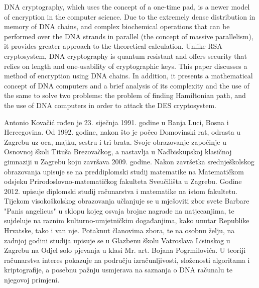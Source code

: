 \documentclass[a4paper,oneside,12pt]{memoir} %
\begin{document}
\begin{spacing}{1.5}
\begin{summary}
DNA cryptography, which uses the concept of a one-time pad, is a newer model of encryption in the computer science. Due to the extremely dense distribution in memory of DNA chains, and complex biochemical operations that can be performed over the DNA strands in parallel (the concept of massive parallelism), it provides greater approach to the theoretical calculation. Unlike RSA cryptosystem, DNA cryptography is quantum resistant and offers security that relies on length and one-usability of cryptographic keys. This paper discusses a method of encryption using DNA chains. In addition, it presents a mathematical concept of DNA computers and a brief analysis of its complexity and the use of the same to solve two problems: the problem of finding Hamiltonian path, and the use of DNA computers in order to attack the DES cryptosystem.
\end{summary}
\begin{cv}
Antonio Kovačić rođen je 23. siječnja 1991. godine u Banja Luci, Bosna i Hercegovina. Od 1992. godine, nakon što je počeo Domovinski rat, odrasta u Zagrebu uz oca, majku, sestru i tri brata. Svoje obrazovanje započinje u Osnovnoj školi Tituša Brezovačkog, a nastavlja u Nadbiskupskoj klasičnoj gimnaziji u Zagrebu koju završava 2009. godine. Nakon završetka srednješkolskog obrazovanja upisuje se na preddiplomski studij matematike na Matematičkom odsjeku Prirodoslovno-matematičkog fakulteta Sveučilišta u Zagrebu. Godine 2012. upisuje diplomski studij računarstva i matematike na istom fakultetu. Tijekom visokoškolskog obrazovanja učlanjuje se u mješoviti zbor svete Barbare "Panis angelicus" u sklopu kojeg osvaja brojne nagrade na natjecanjima, te sujdeluje na raznim kulturno-umjetničkim događanjima, kako unutar Republike Hrvatske, tako i van nje. Potaknut članovima zbora, te na osobnu želju, na zadnjoj godini studija upisuje se u Glazbenu školu Vatroslava Lisinskog u Zagrebu na Odjel solo pjevanja u klasi Mr. art. Bojana Pogrmilovića. U teoriji računarstva interes pokazuje na području izračunljivosti, složenosti algoritama i kriptografije, a posebnu pažnju usmjerava na saznanja o DNA računalu te njegovoj primjeni.
\end{cv}
\end{spacing}
\end{document}

